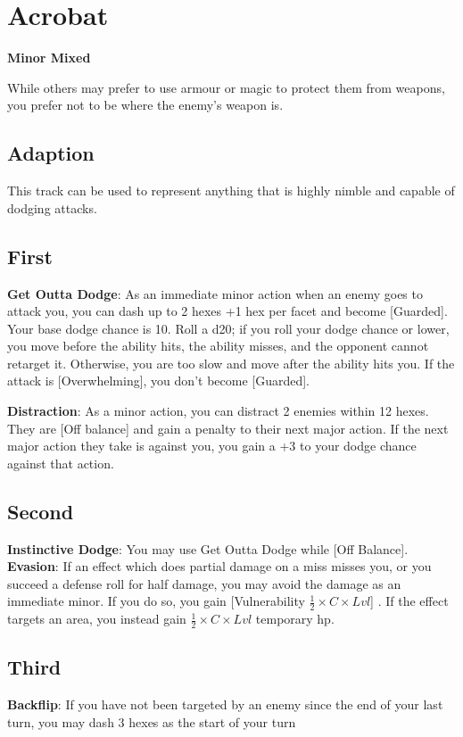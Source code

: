\section{Acrobat}
\textbf{Minor Mixed}

While others may prefer to use armour or magic to protect them from weapons, you prefer not to be where the enemy's weapon is.

\subsection*{Adaption}
This track can be used to represent anything that is highly nimble and capable of dodging attacks.

\begin{multicols*}{2}
\subsection*{First \Facet\perk}
\textbf{Get Outta Dodge}: As an immediate minor action when an enemy goes to attack you, you can dash up to 2 hexes +1 hex per facet and become [Guarded]. Your base dodge chance is 10. Roll a d20; if you roll your dodge chance or lower, you move before the ability hits, the ability misses, and the opponent cannot retarget it. Otherwise, you are too slow and move after the ability hits you. If the attack is [Overwhelming], you don’t become [Guarded].

\textbf{Distraction}: As a minor action, you can distract 2 enemies within 12 hexes. They are [Off balance] and gain a penalty to their next major action. If the next major action they take is against you, you gain a +3 to your dodge chance against that action.

\subsection*{Second \Facet\perk}
\textbf{Instinctive Dodge}: You may use Get Outta Dodge while [Off Balance].
\textbf{Evasion}: If an effect which does partial damage on a miss misses you, or you succeed a defense roll for half damage, you may avoid the damage as an immediate minor. If you do so, you gain [Vulnerability $\frac{1}{2} \times C \times Lvl$] . If the effect targets an area, you instead gain  $\frac{1}{2} \times C \times Lvl$ temporary hp. 

\subsection*{Third \Facet\perk}
\textbf{Backflip}: If you have not been targeted by an enemy since the end of your last turn, you may dash 3 hexes as the start of your turn


\end{multicols*}
